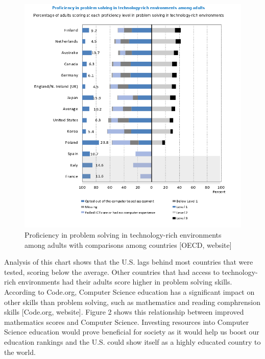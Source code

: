 \documentclass[12pt, letterpaper]{report}
\begin{document}
\begin{figure}[H]
    \centering
    \includegraphics[scale=0.75]{figure1.png}
    \captionsetup{justification=centering}
    \caption{Proficiency in problem solving in technology-rich environments among adults with comparisons among countries [OECD, website]}
\end{figure}

Analysis of this chart shows that the U.S. lags behind most countries that were tested, scoring below the average. Other countries that had access to technology-rich environments had their adults score higher in problem solving skills. According to Code.org, Computer Science education has a significant impact on other skills than problem solving, such as mathematics and reading comphrension skills [Code.org, website]. Figure 2 shows this relationship between improved mathematics scores and Computer Science. Investing resources into Computer Science education would prove beneficial for society as it would help us boost our education rankings and the U.S. could show itself as a highly educated country to the world. \\
\end{document}
